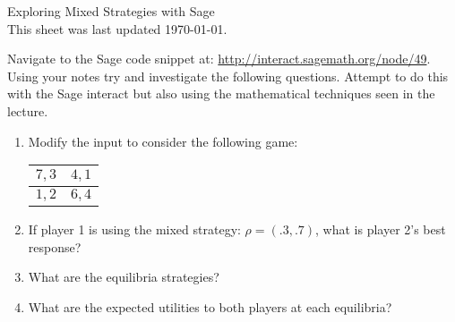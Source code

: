 \documentclass[12pt]{article}
\begin{document}
\begin{center}
\Huge{Exploring Mixed Strategies with Sage\\\tiny{This sheet was last updated \today.} }
\end{center}

Navigate to the Sage code snippet at: \url{http://interact.sagemath.org/node/49}.\\

Using your notes try and investigate the following questions. Attempt to do this with the Sage interact but also using the mathematical techniques seen in the lecture.


\begin{enumerate}
\item Modify the input to consider the following game:
\begin{center}
\begin{tabular}{|c|c|}
\hline
$7,3$&$4,1$\\\hline
$1,2$&$6,4$\\
\hline
\end{tabular}
\end{center}
\item If player 1 is using the mixed strategy: $\rho=(.3,.7)$, what is player 2's best response?
\item What are the equilibria strategies?
\item What are the expected utilities to both players at each equilibria?
\end{enumerate}
\end{document}
